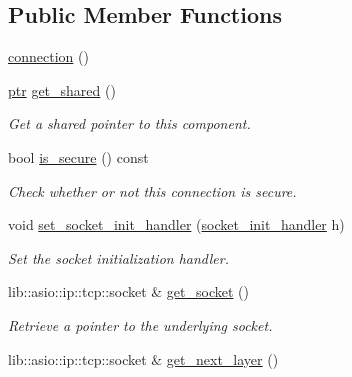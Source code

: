 \subsection*{Public Member Functions}
\begin{DoxyCompactItemize}
\item 
\hyperlink{classwebsocketpp_1_1transport_1_1asio_1_1basic__socket_1_1connection_a8c8b36c6623f84e77e5a628c5f2ca92c}{connection} ()
\item 
\hyperlink{classwebsocketpp_1_1transport_1_1asio_1_1basic__socket_1_1connection_a1a4fa6887235c53c7ddd13307798b280}{ptr} \hyperlink{classwebsocketpp_1_1transport_1_1asio_1_1basic__socket_1_1connection_ade8aecc68665126f6beb82e74169a96d}{get\+\_\+shared} ()
\begin{DoxyCompactList}\small\item\em Get a shared pointer to this component. \end{DoxyCompactList}\item 
bool \hyperlink{classwebsocketpp_1_1transport_1_1asio_1_1basic__socket_1_1connection_afafd7e9eba4a356136e9897f7714a5d4}{is\+\_\+secure} () const 
\begin{DoxyCompactList}\small\item\em Check whether or not this connection is secure. \end{DoxyCompactList}\item 
void \hyperlink{classwebsocketpp_1_1transport_1_1asio_1_1basic__socket_1_1connection_a2ea605a8c2ed46812057b36b7a0ddf6a}{set\+\_\+socket\+\_\+init\+\_\+handler} (\hyperlink{namespacewebsocketpp_1_1transport_1_1asio_1_1basic__socket_a88f9c59fa40db3188769162db98edb93}{socket\+\_\+init\+\_\+handler} h)
\begin{DoxyCompactList}\small\item\em Set the socket initialization handler. \end{DoxyCompactList}\item 
lib\+::asio\+::ip\+::tcp\+::socket \& \hyperlink{classwebsocketpp_1_1transport_1_1asio_1_1basic__socket_1_1connection_ae5026a6893c7bc54be3f7981fceaf849}{get\+\_\+socket} ()
\begin{DoxyCompactList}\small\item\em Retrieve a pointer to the underlying socket. \end{DoxyCompactList}\item 
lib\+::asio\+::ip\+::tcp\+::socket \& \hyperlink{classwebsocketpp_1_1transport_1_1asio_1_1basic__socket_1_1connection_aad9f1b8fec827bc502f450cbf2c0d583}{get\+\_\+next\+\_\+layer} ()

\end{DoxyCompactItemize}
